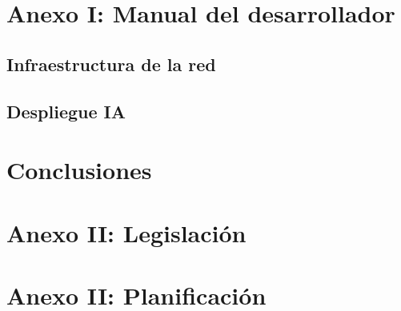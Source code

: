 \documentclass[10pt,a4paper,titlepage]{report}
\begin{document}
\chapter{Anexo I: Manual del desarrollador}
	\section{Infraestructura de la red}
		
	
	\section{Despliegue IA}
		
		

	
\chapter{Conclusiones}
	
		
\chapter{Anexo II: Legislación}	

		
\chapter{Anexo II: Planificación}



\end{document}
